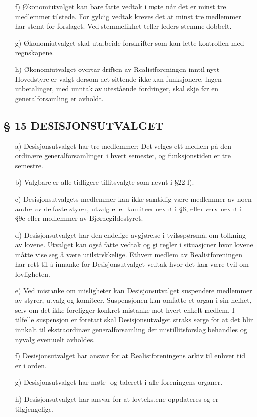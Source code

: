 \begin{itemize}
\item[f)] Økonomiutvalget kan bare fatte vedtak i møte når det er minst tre
medlemmer tilstede. For gyldig vedtak kreves det at minst tre
medlemmer har stemt for forslaget. Ved stemmelikhet teller leders
stemme dobbelt.

\item[g)] Økonomiutvalget skal utarbeide forskrifter som kan lette kontrollen
med regnskapene.

\item[h)] Økonomiutvalget overtar driften av Realistforeningen inntil nytt
Hovedstyre er valgt dersom det sittende ikke kan funksjonere. Ingen
utbetalinger, med unntak av utestående fordringer, skal skje før en
generalforsamling er avholdt.
\end{itemize}
 

\subsection*{§ 15 DESISJONSUTVALGET}

\begin{itemize}
\item[a)] Desisjonsutvalget har tre medlemmer: Det velges ett medlem på den
ordinære generalforsamlingen i hvert semester, og funksjonstiden er
tre semestre.

\item[b)] Valgbare er alle tidligere tillitsvalgte som nevnt i §22 l).

\item[c)] Desisjonsutvalgets medlemmer kan ikke samtidig være medlemmer av
noen andre av de faste styrer, utvalg eller komiteer nevnt i §6, eller
verv nevnt i §9e eller medlemmer av Bjørnegildestyret.

\item[d)] Desisjonsutvalget har den endelige avgjørelse i tvilsspørsmål om
tolkning av lovene. Utvalget kan også fatte vedtak og gi regler i
situasjoner hvor lovene måtte vise seg å være utilstrekkelige. Ethvert
medlem av Realistforeningen har rett til å innanke for
Desisjonsutvalget vedtak hvor det kan være tvil om lovligheten.

\item[e)] Ved mistanke om misligheter kan Desisjonsutvalget suspendere
medlemmer av styrer, utvalg og komiteer. Suspensjonen kan omfatte et
organ i sin helhet, selv om det ikke foreligger konkret mistanke mot
hvert enkelt medlem.  I tilfelle suspensjon er foretatt skal
Desisjonsutvalget straks sørge for at det blir innkalt til
ekstraordinær generalforsamling der mistillitsforslag behandles og
nyvalg eventuelt avholdes.

\item[f)] Desisjonsutvalget har ansvar for at Realistforeningens arkiv til
enhver tid er i orden.
        
\item[g)] Desisjonsutvalget har møte- og talerett i alle foreningens organer. 

\item[h)] Desisjonsutvalget har ansvar for at lovtekstene oppdateres og er tilgjengelige.
\end{itemize}


